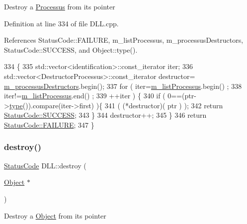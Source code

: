 Destroy a \hyperlink{classProcessus}{Processus} from its pointer 

Definition at line 334 of file D\+L\+L.\+cpp.



References Status\+Code\+::\+F\+A\+I\+L\+U\+RE, m\+\_\+list\+Processus, m\+\_\+processus\+Destructors, Status\+Code\+::\+S\+U\+C\+C\+E\+SS, and Object\+::type().


\begin{DoxyCode}
334                                          \{
335   std::vector<identification>::const\_iterator iter;
336   std::vector<DestructorProcessus>::const\_iterator destructor=
      \hyperlink{classDLL_a5a00cc3723ff34be55c621505f15fc08}{m\_processusDestructors}.begin();
337   \textcolor{keywordflow}{for} ( iter=\hyperlink{classDLL_a197e92b990184a27a74f4a0456897bd5}{m\_listProcessus}.begin() ;
338         iter!=\hyperlink{classDLL_a197e92b990184a27a74f4a0456897bd5}{m\_listProcessus}.end() ;
339         ++iter ) \{
340     \textcolor{keywordflow}{if} ( 0==(ptr->\hyperlink{classObject_a84f99f70f144a83e1582d1d0f84e4e62}{type}()).compare(iter->first) )\{
341       ( (*destructor)( ptr ) );
342       \textcolor{keywordflow}{return} \hyperlink{classStatusCode_a6f565cbeadc76d14c72f047e5e85eb4badd0da38d3ba0d922efd1f4619bc37ad8}{StatusCode::SUCCESS};
343     \}
344     destructor++;
345   \}
346   \textcolor{keywordflow}{return} \hyperlink{classStatusCode_a6f565cbeadc76d14c72f047e5e85eb4ba3da73d4c469762eb9d3c960368252b26}{StatusCode::FAILURE};
347 \}
\end{DoxyCode}
\mbox{\label{classDLL_a4334ca0b1639c39d905c3553f5b9d507}} 
\subsubsection{\texorpdfstring{destroy()}{destroy()}\hspace{0.1cm}{\footnotesize\ttfamily [3/3]}}
{\footnotesize\ttfamily \hyperlink{classStatusCode}{Status\+Code} D\+L\+L\+::destroy (\begin{DoxyParamCaption}\item[{\hyperlink{classObject}{Object} $\ast$}]{ }\end{DoxyParamCaption})}

Destroy a \hyperlink{classObject}{Object} from its pointer \mbox{\label{classDLL_a946b5d7e4b0b200b7acf190aa58bf9c4}} 
